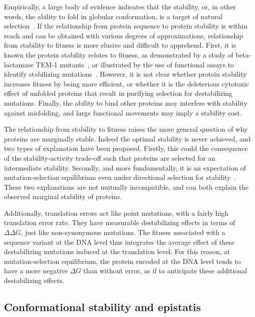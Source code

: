 Empirically, a large body of evidence indicates that the stability, or, in other words, the ability to fold in globular conformation, is a target of natural selection~\citep{Sikosek2014}.
If the relationship from protein sequence to protein stability is within reach and can be obtained with various degrees of approximations, relationship from stability to fitness is more elusive and difficult to apprehend.
First, it is known the protein stability relates to fitness, as demonstrated by a study of beta-lactamase TEM-1 mutants~\citep{Jacquier2013}, or illustrated by the use of functional assays to identify stabilizing mutations~\citep{Araya2012}.
However, it is not clear whether protein stability increases fitness by being more efficient, or whether it is the deleterious cytotoxic effect of unfolded proteins that result in purifying selection for destabilizing mutations.
Finally, the ability to bind other proteins may interfere with stability against misfolding, and large functional movements may imply a stability cost.

The relationship from stability to fitness raises the more general question of why proteins are marginally stable.
Indeed the optimal stability is never achieved, and two types of explanation have been proposed.
Firstly, this could the consequence of the stability-activity trade-off such that proteins are selected for an intermediate stability.
Secondly, and more fundamentally, it is an expectation of mutation-selection equilibrium even under directional selection for stability~\citep{Taverna2002}.
These two explanations are not mutually incompatible, and can both explain the observed marginal stability of proteins.

Additionally, translation errors act like point mutations, with a fairly high translation error rate.
They have measurable destabilizing effects in terms of $\Delta \Delta G$, just like non-synonymous mutations.
The fitness associated with a sequence variant at the DNA level thus integrates the average effect of these destabilizing mutations induced at the translation level.
For this reason, at mutation-selection equilibrium, the protein encoded at the DNA level tends to have a more negative $\Delta G$ than without error, as if to anticipate these additional destabilizing effects.

\subsection{Conformational stability and epistatis}
\label{subsec:conformational-stability-and-epistatis}

